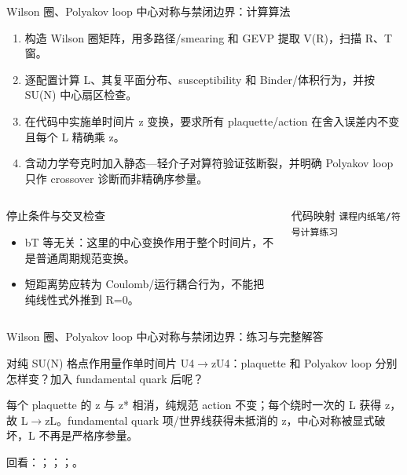 \begin{frame}[t]{Wilson 圈、Polyakov loop 中心对称与禁闭边界：计算算法}
\footnotesize
{}\begin{enumerate}
\item 构造 Wilson 圈矩阵，用多路径/\allowbreak{}smearing 和 GEVP 提取 V(R)，扫描 R、T 窗。
\item 逐配置计算 L、其复平面分布、susceptibility 和 Binder/\allowbreak{}体积行为，并按 SU(N) 中心扇区检查。
\item 在代码中实施单时间片 z 变换，要求所有 plaquette/\allowbreak{}action 在舍入误差内不变且每个 L 精确乘 z。
\item 含动力学夸克时加入静态—轻介子对算符验证弦断裂，并明确 Polyakov loop 只作 crossover 诊断而非精确序参量。
\end{enumerate}\begin{columns}[T,onlytextwidth]
\begin{block}{停止条件与交叉检查}\scriptsize\begin{itemize}
\item[\CheckMark] bT 等无关：这里的中心变换作用于整个时间片，不是普通周期规范变换。
\item[\CheckMark] 短距离势应转为 Coulomb/\allowbreak{}运行耦合行为，不能把纯线性式外推到 R=0。
\end{itemize}\end{block}
\begin{block}{代码映射}
\scriptsize \texttt{课程内纸笔/\allowbreak{}符号计算练习}
\end{block}\end{columns}\end{frame}

\begin{frame}[t]{Wilson 圈、Polyakov loop 中心对称与禁闭边界：练习与完整解答}
\footnotesize
\begin{block}{}对纯 SU(N) 格点作用量作单时间片 U4\ensuremath{\rightarrow}zU4：plaquette 和 Polyakov loop 分别怎样变？加入 fundamental quark 后呢？\end{block}
\begin{exampleblock}{}每个 plaquette 的 z 与 z* 相消，纯规范 action 不变；每个绕时一次的 L 获得 z，故 L\ensuremath{\rightarrow}zL。fundamental quark 项/\allowbreak{}世界线获得未抵消的 z，中心对称被显式破坏，L 不再是严格序参量。\end{exampleblock}
\vfill
\scriptsize 回看：；；；。
\end{frame}

